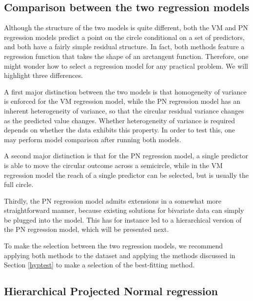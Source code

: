 \hypertarget{comparison-between-the-two-regression-models}{%
\subsection{Comparison between the two regression
models}\label{comparison-between-the-two-regression-models}}

Although the structure of the two models is quite different, both the VM
and PN regression models predict a point on the circle conditional on a
set of predictors, and both have a fairly simple residual structure. In
fact, both methods feature a regression function that takes the shape of
an arctangent function. Therefore, one might wonder how to select a
regression model for any practical problem. We will highlight three
differences.

A first major distinction between the two models is that homogeneity of
variance is enforced for the VM regression model, while the PN
regression model has an inherent heterogeneity of variance, so that the
circular residual variance changes as the predicted value changes.
Whether heterogeneity of variance is required depends on whether the
data exhibits this property. In order to test this, one may perform
model comparison after running both models.

A second major distinction is that for the PN regression model, a single
predictor is able to move the circular outcome across a semicircle,
while in the VM regression model the reach of a single predictor can be
selected, but is usually the full circle.

Thirdly, the PN regression model admits extensions in a somewhat more
straightforward manner, because existing solutions for bivariate data
can simply be plugged into the model. This has for instance led to a
hierarchical version of the PN regression model, which will be presented
next.

To make the selection between the two regression models, we recommend
applying both methods to the dataset and applying the methods discussed
in Section \ref{hyptest} to make a selection of the best-fitting method.

\hypertarget{hierarchical-projected-normal-regression}{%
\subsection{Hierarchical Projected Normal
regression}\label{hierarchical-projected-normal-regression}}

